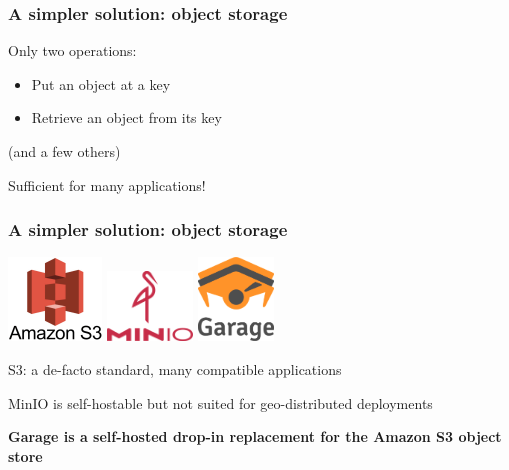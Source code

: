 \documentclass[aspectratio=169]{beamer}
\begin{document}
\begin{frame}
	\frametitle{A simpler solution: object storage}
	Only two operations:
	\vspace{1em}
	\begin{itemize}
		\item Put an object at a key
			\vspace{1em}
		\item Retrieve an object from its key
	\end{itemize}
	\vspace{1em}
	{\footnotesize (and a few others)}

	\vspace{1em}
	Sufficient for many applications!
\end{frame}

\begin{frame}
	\frametitle{A simpler solution: object storage}
		\begin{center}
			\includegraphics[height=6em]{../2020-12-02_wide-team/img/Amazon-S3.jpg}
			\hspace{3em}
			\includegraphics[height=5em]{assets/minio.png}
			\hspace{3em}
			\includegraphics[height=6em]{../../logo/garage_hires_crop.png}
		\end{center}
		\vspace{1em}
	S3: a de-facto standard, many compatible applications

	\vspace{1em}

	MinIO is self-hostable but not suited for geo-distributed deployments

	\vspace{1em}

	\textbf{Garage is a self-hosted drop-in replacement for the Amazon S3 object store}
\end{frame}
\end{document}
